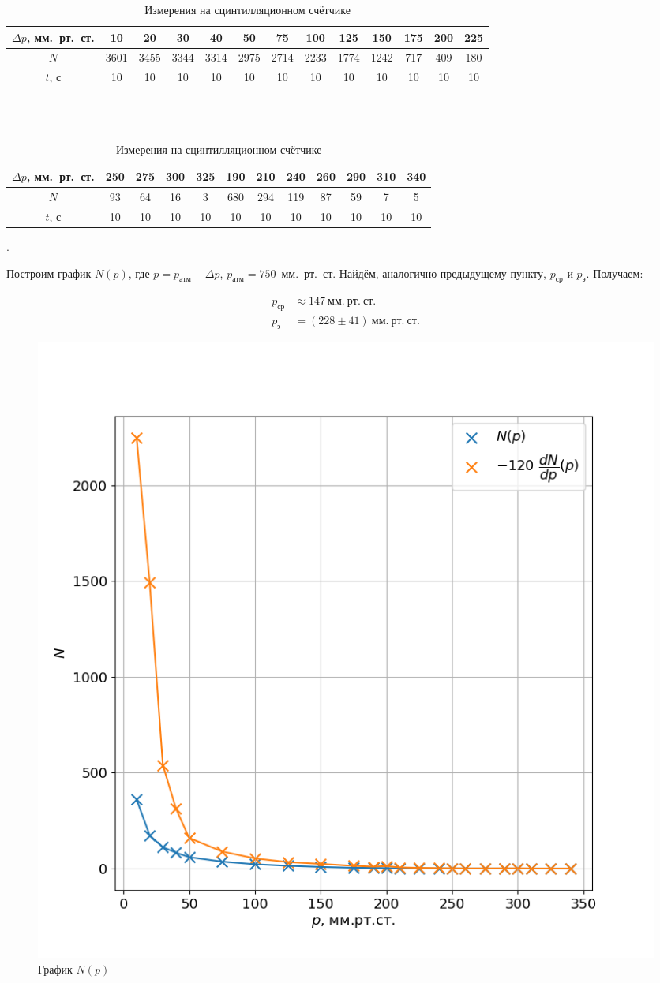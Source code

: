 \documentclass[a4paper, 12pt]{article}
\newcounter{Points}
\newcommand{\point}{\arabic{Points}. \addtocounter{Points}{1}}
\begin{document}
\begin{table}[!h]
    \centering
    \begin{tabular}{|c|c|c|c|c|c|c|c|c|c|c|c|c|}
        \hline
        $\Delta p$, мм.~рт.~ст. & 10 & 20 & 30 & 40 & 50 & 75 & 100 & 125 & 150 & 175 & 200 & 225\\ \hline
        $N$ & 3601 & 3455 & 3344 & 3314 & 2975 & 2714 & 2233 & 1774 & 1242 & 717 & 409 & 180\\ \hline
        $t$, с & 10 & 10 & 10 & 10 & 10 & 10 & 10 & 10 & 10 & 10 & 10 & 10\\ \hline
    \end{tabular}
    \\~\\
    \begin{tabular}{|c|c|c|c|c|c|c|c|c|c|c|c|}
        \hline
        $\Delta p$, мм.~рт.~ст. & 250 & 275 & 300 & 325 & 190 & 210 & 240 & 260 & 290 & 310 & 340\\ \hline
        $N$ & 93 & 64 & 16 & 3 & 680 & 294 & 119 & 87 & 59 & 7 & 5\\ \hline
        $t$, с & 10 & 10 & 10 & 10 & 10 & 10 & 10 & 10 & 10 & 10 & 10\\ \hline
    \end{tabular}
    \caption {Измерения на сцинтилляционном счётчике}
    \label{tab:sc}
\end{table}

\point Построим график $N (p)$, где $p = p_{атм} - \Delta p$, $p_{атм} = 750$~мм.~рт.~ст. Найдём, аналогично предыдущему пункту, $p_{ср}$ и $p_э$. Получаем:

\begin{align*}
    p_{ср} &\approx 147 ~ мм.~рт.~ст.  \\
    p_э &= (228 \pm 41) ~ мм.~рт.~ст.
\end{align*}

\begin{figure}[!h]
    \includegraphics[scale = 0.6]{sc.png}
    \centering
    \caption{График $N(p)$}
    \label{img:sc}
\end{figure}
\end{document}
